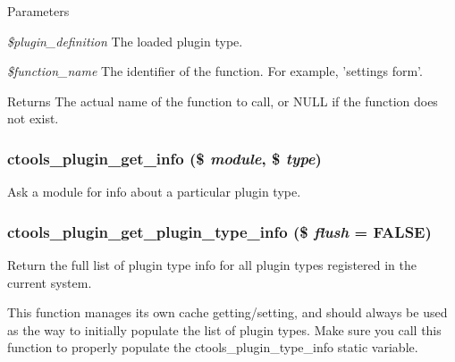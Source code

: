 \begin{DoxyParams}{Parameters}
\item[{\em \$plugin\_\-definition}]The loaded plugin type. \item[{\em \$function\_\-name}]The identifier of the function. For example, 'settings form'.\end{DoxyParams}
\begin{DoxyReturn}{Returns}
The actual name of the function to call, or NULL if the function does not exist. 
\end{DoxyReturn}
\hypertarget{ctools_2includes_2plugins_8inc_addf3f6a3107a10cf5fb701420a9f8dcb}{
\subsubsection[{ctools\_\-plugin\_\-get\_\-info}]{\setlength{\rightskip}{0pt plus 5cm}ctools\_\-plugin\_\-get\_\-info (\$ {\em module}, \/  \$ {\em type})}}
\label{ctools_2includes_2plugins_8inc_addf3f6a3107a10cf5fb701420a9f8dcb}
Ask a module for info about a particular plugin type. \hypertarget{ctools_2includes_2plugins_8inc_a33425fdf7b78f6c83c9dcb3dc550e2c3}{
\subsubsection[{ctools\_\-plugin\_\-get\_\-plugin\_\-type\_\-info}]{\setlength{\rightskip}{0pt plus 5cm}ctools\_\-plugin\_\-get\_\-plugin\_\-type\_\-info (\$ {\em flush} = {\ttfamily FALSE})}}
\label{ctools_2includes_2plugins_8inc_a33425fdf7b78f6c83c9dcb3dc550e2c3}
Return the full list of plugin type info for all plugin types registered in the current system.

This function manages its own cache getting/setting, and should always be used as the way to initially populate the list of plugin types. Make sure you call this function to properly populate the ctools\_\-plugin\_\-type\_\-info static variable.

